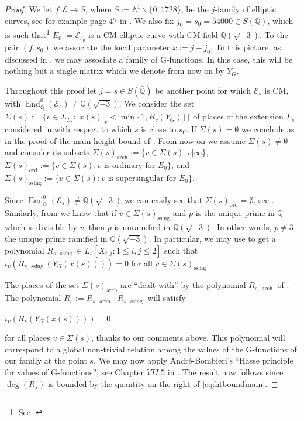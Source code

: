 \documentclass[12pt,twoside,a4paper]{article}
\theoremstyle{plain}%
\DeclareMathOperator{\End}{End}
\DeclareMathOperator{\ord}{ord}
\DeclareMathOperator{\arch}{arch}
\DeclareMathOperator{\ssing}{ssing}
\newcommand{\Q}{\mathbb{Q}}
\newcommand{\CE}{\mathcal{E}}
\begin{document}
\begin{proof} We let $f:\CE\rightarrow S$, where $S:=\mathbb{A}^1\backslash \{0,1728\}$, be the $j$-family of elliptic curves, see for example page $47$ in \cite{silvermanell}. We also fix $j_0=s_0=54000\in S(\Q)$, which is such that\footnote{See \cite[\href{https://www.lmfdb.org/EllipticCurve/2.0.3.1/144.1/CMa/2}{Elliptic Curve 144.1-CMa2}]{lmfdb}.} $E_0:=\CE_{s_0}$ is a CM elliptic curve with CM field $\Q(\sqrt{-3})$. To the pair $(f,s_0)$ we associate the local parameter $x:=j-j_0$. To this picture, as discussed in , we may associate a family of G-functions. In this case, this will be nothing but a single matrix which we denote from now on by $Y_G$.
	
Throughout this proof let $j=s\in S(\bar{\Q})$ be another point for which $\CE_s$ is CM, with $\End^{0}_{\bar{\Q}}(\CE_s)\neq \Q(\sqrt{-3})$. We consider the set $\Sigma(s):=\{v\in \Sigma_{L_s}:|x(s)|_v<\min\{1,R_v(Y_G)\}\}$ of places of the extension $L_s$ considered in  with respect to which $s$ is close to $s_0$. If $\Sigma(s)=\emptyset$ we conclude as in the proof of the main height bound of \cite{papasbigboi}. From now on we assume $\Sigma(s)\neq \emptyset$ and consider its subsets $\Sigma(s)_{\arch}:=\{v\in \Sigma(s):v|\infty\}$, $\Sigma(s)_{\ord}:=\{v\in\Sigma(s):v \text{ is ordinary for }E_{0} \}$, and $\Sigma(s)_{\ssing}:=\{v\in\Sigma(s):v  \text{ is supersingular for }E_0\}$.

Since $\End^{0}_{\bar{\Q}}(\CE_s)\neq \Q(\sqrt{-3})$ we can easily see that $\Sigma(s)_{\ord}=\emptyset$, see . Similarly, from  we know that if $v\in \Sigma(s)_{\ssing}$ and $p$ is the unique prime in $\Q$ which is divisible by $v$, then $p$ is unramified in $\Q(\sqrt{-3})$. In other words, $p\neq 3$ the unique prime ramified in $\Q(\sqrt{-3})$. In particular, we may use  to get a polynomial $R_{s,\ssing}\in L_s[X_{i,j}:1\leq i,j\leq 2]$ such that $\iota_v(R_{s,\ssing}(Y_G(x(s))))=0$ for all $v\in\Sigma(s)_{\ssing}$. 

The places of the set $\Sigma(s)_{\arch}$ are ``dealt with'' by the polynomial $R_{s,\arch}$ of . The polynomial $R_{s}:=R_{s,\arch}\cdot R_{s,\ssing}$ will satisfy \begin{center}
	$\iota_v(R_{s}(Y_G(x(s))))=0$
\end{center} for all places $v\in\Sigma(s)$, thanks to our comments above. This polynomial will correspond to a global non-trivial relation among the values of the G-functions of our family at the point $s$. We may now apply Andr\'e-Bombieri's ``Hasse principle for values of G-functions'', see Chapter $VII.5$ in \cite{andre1989g}. The result now follows since $\deg(R_s)$ is bounded by the quantity on the right of \eqref{eq:htboundmain}.\end{proof}
\end{document}
